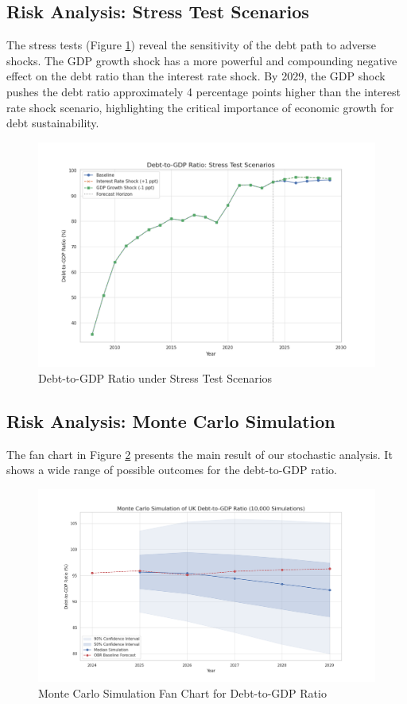 \documentclass[12pt, a4paper]{article}
\begin{document}
\subsection{Risk Analysis: Stress Test Scenarios}
The stress tests (Figure \ref{fig:stress_tests}) reveal the sensitivity of the debt path to adverse shocks. The GDP growth shock has a more powerful and compounding negative effect on the debt ratio than the interest rate shock. By 2029, the GDP shock pushes the debt ratio approximately 4 percentage points higher than the interest rate shock scenario, highlighting the critical importance of economic growth for debt sustainability.

\begin{figure}[h!]
    \centering
    \includegraphics[width=\textwidth]{plots/stress_test_scenarios.png}
    \caption{Debt-to-GDP Ratio under Stress Test Scenarios}
    \label{fig:stress_tests}
\end{figure}

\subsection{Risk Analysis: Monte Carlo Simulation}
The fan chart in Figure \ref{fig:mc_fan} presents the main result of our stochastic analysis. It shows a wide range of possible outcomes for the debt-to-GDP ratio.

\begin{figure}[h!]
    \centering
    \includegraphics[width=\textwidth]{plots/monte_carlo_fan_chart.png}
    \caption{Monte Carlo Simulation Fan Chart for Debt-to-GDP Ratio}
    \label{fig:mc_fan}
\end{figure}
\end{document}
